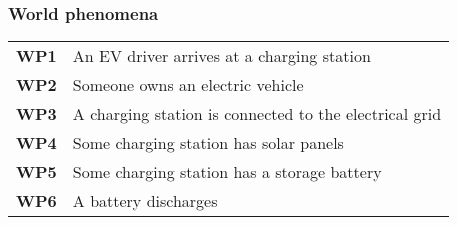 \subsubsection*{World phenomena}
\begin{table}[H]
    \begin{tabularx}{\textwidth}{cX}
        \toprule
        \textbf{WP1} & An EV driver arrives at a charging station             \\
        \textbf{WP2} & Someone owns an electric vehicle                       \\
        \textbf{WP3} & A charging station is connected to the electrical grid \\
        \textbf{WP4} & Some charging station has solar panels                 \\
        \textbf{WP5} & Some charging station has a storage battery            \\
        \textbf{WP6} & A battery discharges                                   \\ \bottomrule
    \end{tabularx}
\end{table}
